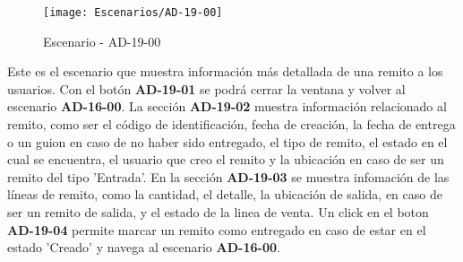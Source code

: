 \begin{figure}[H]
\centering
\texttt{[image: Escenarios/AD-19-00]}
\caption{Escenario - AD-19-00}
\label{fig:AD-19-00}
\end{figure}
Este es el escenario que muestra información más detallada de una remito a los usuarios.
Con el botón \textbf{AD-19-01} se podrá cerrar la ventana y volver al escenario \textbf{AD-16-00}. La sección \textbf{AD-19-02} muestra información relacionado al remito, como ser el código de identificación, fecha de creación, la fecha de entrega o un guion en caso de no haber sido entregado, el tipo de remito, el estado en el cual se encuentra, el usuario que creo el remito y la ubicación en caso de ser un remito del tipo 'Entrada'.
En la sección \textbf{AD-19-03} se muestra infomación de las líneas de remito, como la cantidad, el detalle, la ubicación de salida, en caso de ser un remito de salida, y el estado de la linea de venta. Un click en el boton \textbf{AD-19-04} permite marcar un remito como entregado en caso de estar en el estado 'Creado' y navega al escenario \textbf{AD-16-00}. 
\\
